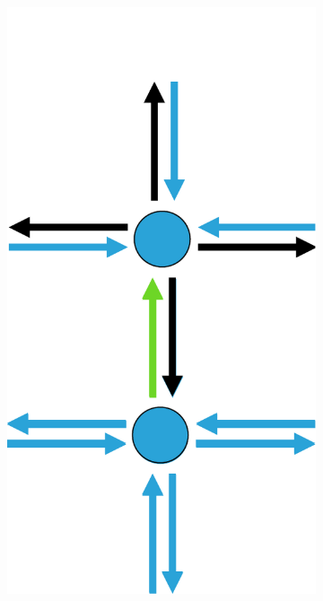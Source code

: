 \documentclass[12pt]{article}
\begin{document}
\begin{figure}[tb]
  ~
  \begin{subfigure}[b]{0.15\textwidth}
      \includegraphics[width=\textwidth]{img/2}
      \caption{}\label{fig:contraction_kernel_greedy2}
  \end{subfigure}
  ~
  \begin{subfigure}[b]{0.15\textwidth}

\end{subfigure}
\end{figure}
\end{document}
